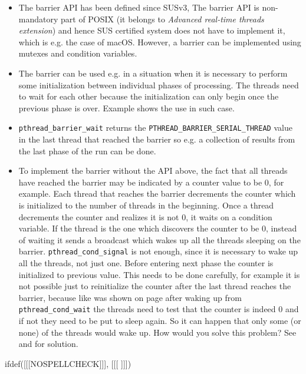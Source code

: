 \begin{itemize}
\item The barrier API has been defined since SUSv3,
The barrier API is non-mandatory part of POSIX (it belongs to
\emph{Advanced real-time threads extension}) and hence SUS certified system does
not have to implement it, which is e.g. the case of macOS.
However, a barrier can be implemented using mutexes and condition variables.
\item The barrier can be used e.g. in a situation when it is necessary to
perform some initialization between individual phases of processing.
The threads need to wait for each other because the initialization can only
begin once the previous phase is over.
Example  shows the use in such case.
\item \texttt{pthread\_barrier\_wait} returns
the \texttt{PTHREAD\_BARRIER\_SERIAL\_THREAD} value
in the last thread that reached the barrier so e.g. a collection of
results from the last phase of the run can be done.
\item To implement the barrier without the API above, the fact that all threads
have reached the barrier may be indicated by a counter value to be 0, for
example.  Each thread that reaches the barrier decrements the counter which is
initialized to the number of threads in the beginning.  Once a thread decrements
the counter and realizes it is not 0, it waits on a condition variable.  If the
thread is the one which discovers the counter to be 0, instead of waiting it
sends a broadcast which wakes up all the threads sleeping on the barrier.
\texttt{pthread\_cond\_signal} is not enough, since it is necessary to wake up
all the threads, not just one.  Before entering next phase the counter is
initialized to previous value.  This needs to be done carefully, for example it
is not possible just to reinitialize the counter after the last thread reaches
the barrier, because like was shown on page \pageref{CONDITION_VARIABLES} after
waking up from \texttt{pthread\_cond\_wait} the threads need to test that the
counter is indeed 0 and if not they need to be put to sleep again. So it can
happen that only some (or none) of the threads would wake up.  How would you
solve this problem? See  and
 for solution.
\end{itemize}


ifdef([[[NOSPELLCHECK]]], [[[
]]])

